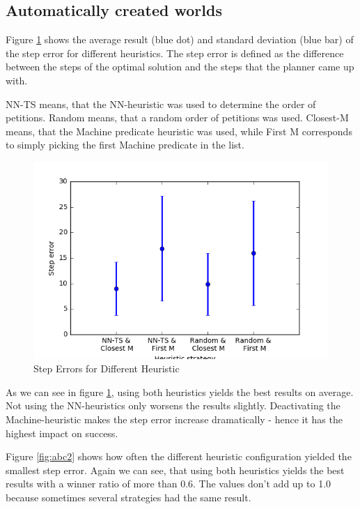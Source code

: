 \subsection{Automatically created worlds}

Figure \ref{fig:abc1} shows the average result (blue dot) and standard deviation (blue bar) of the step error for different heuristics. The step error is defined as the difference between the steps of the optimal solution and the steps that the planner came up with.

NN-TS means, that the NN-heuristic was used to determine the order of petitions. Random means, that a random order of petitions was used. Closest-M means, that the Machine predicate heuristic was used, while First M corresponds to simply picking the first Machine predicate in the list.


\begin{figure}[!hbt]
  \includegraphics[width=1.1\textwidth]{img/step_error_vs_heuristic}
  \caption{Step Errors for Different Heuristic}
  \label{fig:abc1}
\end{figure}

As we can see in figure \ref{fig:abc1}, using both heuristics yields the best results on average. Not using the NN-heuristics only worsens the results slightly. Deactivating the Machine-heuristic makes the step error increase dramatically - hence it has the highest impact on success.

Figure \ref{fig:abc2} shows how often the different heuristic configuration yielded the smallest step error. Again we can see, that using both heuristics yields the best results with a winner ratio of more than 0.6. The values don't add up to 1.0 because sometimes several strategies had the same result.

